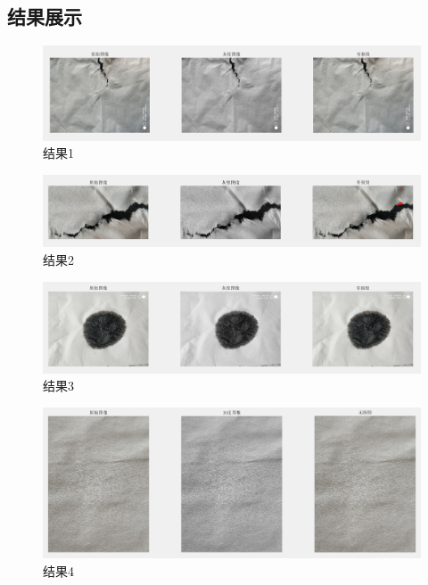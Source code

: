 \documentclass[UTF8]{ctexart}
\begin{document}
		\subsection{结果展示}\label{show}
	
			\begin{figure}[H]
				\centering 
				\includegraphics[scale=0.3]{res1.png} 
				\caption{结果1} 
				\label{res1}
			\end{figure}
		
			\begin{figure}[H]
				\centering 
				\includegraphics[scale=0.3]{res2.png} 
				\caption{结果2} 
				\label{res2}
			\end{figure}
		
			\begin{figure}[H]
				\centering 
				\includegraphics[scale=0.4]{res3.png} 
				\caption{结果3} 
				\label{res3}
			\end{figure}
		
			\begin{figure}[H]
				\centering 
				\includegraphics[scale=0.4]{res4.png} 
				\caption{结果4} 
				\label{res4}
			\end{figure}
		
\end{document}
